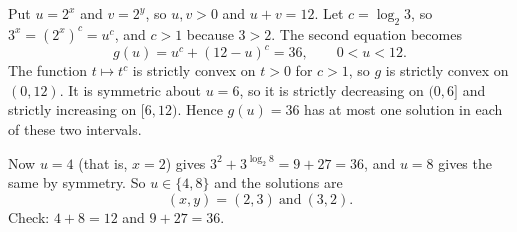 Put $u=2^x$ and $v=2^y$, so $u,v>0$ and $u+v=12$. Let $c=\log_2 3$, so $3^x=(2^x)^c=u^c$, and $c>1$ because $3>2$. The second equation becomes
\[
g(u)=u^c+(12-u)^c=36,\qquad 0<u<12 .
\]
The function $t\mapsto t^c$ is strictly convex on $t>0$ for $c>1$, so $g$ is strictly convex on $(0,12)$. It is symmetric about $u=6$, so it is strictly decreasing on $(0,6]$ and strictly increasing on $[6,12)$. Hence $g(u)=36$ has at most one solution in each of these two intervals.

Now $u=4$ (that is, $x=2$) gives $3^2+3^{\log_2 8}=9+27=36$, and $u=8$ gives the same by symmetry. So $u\in\{4,8\}$ and the solutions are
\[
\boxed{(x,y)=(2,3)\ \text{and}\ (3,2)} .
\]
Check: $4+8=12$ and $9+27=36$.
